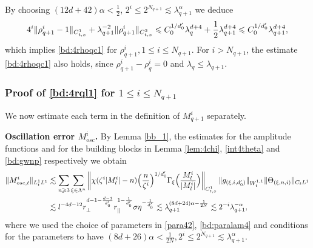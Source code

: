 \documentclass[UTF-8,reqno]{amsart}
\numberwithin{equation}{section}
\theoremstyle{definition}
\def\({{\Big(}}
\def\){{\Big)}}
\newcommand{\norm}[1]{\left\|#1\right\|}
\def\geq{\geqslant}
\def\leq{\leqslant}
\def\({{\Big(}}
\def\){{\Big)}}
\def\geq{\geqslant}
\def\leq{\leqslant}
\begin{document}
By choosing $(12d+42)\alpha<\frac{1}{2}$, $2^i\leq2^{N_{q+1}}\lesssim\lambda_{q+1}^{\alpha}$ we deduce 
\begin{align}
    4^i\|\rho^{i}_{q+1} -1\|_{C_{t,x}^1}+\lambda_{q+1}^{-2}\|\rho^{i}_{q+1}\|_{C_{t,x}^2}%
    \leq C_0^{1/d_0'}\lambda_{q}^{d+4}+ \frac12\lambda_{q+1}^{d+4}\leq C_0^{1/d_0'}\lambda_{q+1}^{d+4},\notag
\end{align}
which implies  \eqref{bd:4rhoqc1} for $\rho^{i}_{q+1},1\leq i\leq N_{q+1}$. For $i>N_{q+1}$, the estimate \eqref{bd:4rhoqc1} also holds, since
$
\rho_{q+1}^i-\rho_q^i=0
$
and
$
\lambda_q\leq\lambda_{q+1}.
$

\subsubsection{Proof of  \eqref{bd:4rql1} for $1\leq i\leq N_{q+1}$}\label{sec:4estmq+1} We now estimate each term in the definition of $M_{q+1}^i$ separately.

 
\textbf{Oscillation error $M^{i}_{osc}$.} By Lemma \ref{bb_1}, the estimates for the amplitude functions and for the building blocks in  Lemma \ref{lem:4chi}, \eqref{int4theta} and \eqref{bd:gwnp} respectively   we obtain
\begin{align}
    \|M^{i}_{osc,t}\|_{L^1_tL^1}%
    &\lesssim \sum_{n\geq3}\sum_{\xi\in\Lambda^{n}}\norm{\chi(\zeta^{i}|M^{i}_l|-n)\(\frac{n}{\zeta^{i}}\)^{1/d_0'}\Gamma_{\xi}\(\frac{M^{i}_l}{|M^{i}_l|}\)}_{C_{t,x}^1}\|g_{(\xi,i,d_0')}\|_{W_t^{1,1}} \|\Theta_{(\xi,n,i)}\|_{C_tL^1}\notag\\
    &\lesssim l^{-4d-12}r_\perp^{d-1-\frac{d-1}{d_0'}}r_\parallel^{1-\frac{1}{d_0'}}\sigma \eta^{-\frac{1}{d_0'}}\lesssim \lambda_{q+1}^{(8d+24)\alpha-\frac 1{2N}}\lesssim2^{-i} \lambda_{q+1}^{-\alpha},\notag
\end{align}
where we used the choice of parameters in 
\eqref{para42},  \eqref{bd:paralam4} and  conditions for the parameters to have $(8d+26)\alpha<\frac 1{2N},2^i\leq2^{N_{q+1}}\lesssim \lambda_{q+1}^\alpha$.
\end{document}
